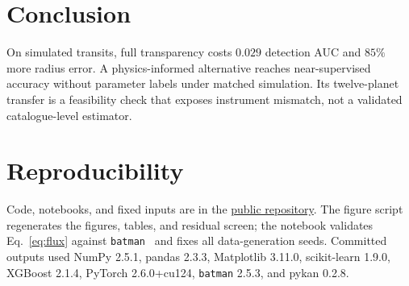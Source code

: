 \documentclass[manuscript,nonacm]{acmart}
\begin{document}
\section{Conclusion}
On simulated transits, full transparency costs $0.029$ detection AUC and $85\%$ more
radius error. A physics-informed alternative reaches near-supervised accuracy without
parameter labels under matched simulation. Its twelve-planet transfer is a feasibility
check that exposes instrument mismatch, not a validated catalogue-level estimator.

\section*{Reproducibility}
Code, notebooks, and fixed inputs are in the
\href{https://github.com/guptaishaan/research-projects/tree/icaise-2026-format/exoplanet-model-comparison}{public repository}.
The figure script regenerates the figures, tables, and residual screen; the notebook
validates Eq.~\eqref{eq:flux} against
\texttt{batman}~\cite{kreidberg2015batman} and fixes all data-generation seeds. Committed
outputs used NumPy 2.5.1, pandas 2.3.3, Matplotlib 3.11.0, scikit-learn 1.9.0,
XGBoost 2.1.4, PyTorch 2.6.0+cu124, \texttt{batman} 2.5.3, and pykan 0.2.8.



\end{document}
